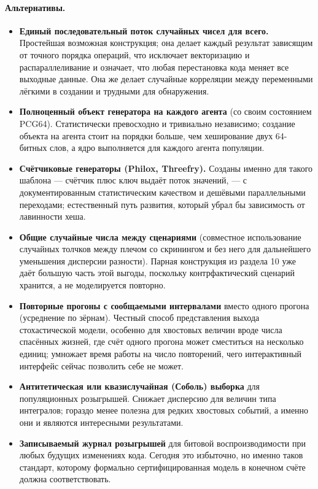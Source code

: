 \documentclass[12pt,a4paper]{article}
\newcommand{\alt}[1]{\paragraph{Альтернативы.} #1}
\begin{document}
\alt{\begin{itemize}[nosep]
  \item \textbf{Единый последовательный поток случайных чисел для всего.} Простейшая возможная конструкция;
        она делает каждый результат зависящим от точного порядка операций, что исключает векторизацию и
        распараллеливание и означает, что любая перестановка кода меняет все выходные данные. Она же делает
        случайные корреляции между переменными лёгкими в создании и трудными для обнаружения.
  \item \textbf{Полноценный объект генератора на каждого агента} (со своим состоянием PCG64). Статистически
        превосходно и тривиально независимо; создание объекта на агента стоит на порядки больше, чем
        хеширование двух 64-битных слов, а ядро выполняется для каждого агента популяции.
  \item \textbf{Счётчиковые генераторы (Philox, Threefry).} Созданы именно для такого шаблона --- счётчик
        плюс ключ выдаёт поток значений, --- с документированным статистическим качеством и дешёвыми
        параллельными переходами; естественный путь развития, который убрал бы зависимость от лавинности
        хеша.
  \item \textbf{Общие случайные числа между сценариями} (совместное использование случайных толчков между
        плечом со скринингом и без него для дальнейшего уменьшения дисперсии разности). Парная конструкция
        из раздела 10 уже даёт большую часть этой выгоды, поскольку контрфактический сценарий хранится, а не
        моделируется повторно.
  \item \textbf{Повторные прогоны с сообщаемыми интервалами} вместо одного прогона (усреднение по зёрнам).
        Честный способ представления выхода стохастической модели, особенно для хвостовых величин вроде
        числа спасённых жизней, где счёт одного прогона может сместиться на несколько единиц; умножает
        время работы на число повторений, чего интерактивный интерфейс сейчас позволить себе не может.
  \item \textbf{Антитетическая или квазислучайная (Соболь) выборка} для популяционных розыгрышей. Снижает
        дисперсию для величин типа интегралов; гораздо менее полезна для редких хвостовых событий, а именно
        они и являются интересными результатами.
  \item \textbf{Записываемый журнал розыгрышей} для битовой воспроизводимости при любых будущих изменениях
        кода. Сегодня это избыточно, но именно таков стандарт, которому формально сертифицированная модель
        в конечном счёте должна соответствовать.
\end{itemize}}
\end{document}
